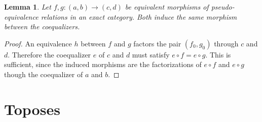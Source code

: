 \documentclass[sort&compress,draft]{elsarticle}
\theoremstyle{plain}
\newtheorem{lemma}[theorem]{Lemma}
\theoremstyle{definition}
\theoremstyle{remark}
\newcommand\hide[1]{}
\newcommand\cat\mathcal
\newcommand\of:
\newcommand\id{\mathrm{id}}
\newcommand\cod{\mathrm{cod}}
\newcommand\di{_!}
\begin{document}
\begin{lemma} Let $f,g\of(a,b)\to(c,d)$ be equivalent morphisms of pseudo-e\-qui\-va\-len\-ce relations in an exact category. Both induce the same morphism between the coequalizers. \label{equivalence implies equality} \end{lemma}

\begin{proof} An equivalence $h$ between $f$ and $g$ factors the pair $(f_0,g_0)$ through $c$ and $d$. Therefore the coequalizer $e$ of $c$ and $d$ must satisfy $e\circ f=e\circ g$. This is sufficient, since the induced morphisms are the factorizations of $e \circ f$ and $e\circ g$ though the coequalizer of $a$ and $b$.
\end{proof}


\hide{\begin{lemma} Let $F\of\cat C\to\cat D$ be a finite limit preserving fully faithful between categories with finite limits and let $\cat D$ be exact. If for each exact $\cat E$ each finite limit preserving functor $G\of\cat C\to\cat E$ has a finite limit preserving left Kan extension $F\di(G)$ along $F$ then $F$ is resolvent. \label{left to resolvent}\end{lemma}

\begin{proof} Define $\cat E$ as follows. Objects are regular epimorphisms $FX\to Y$ in $\cat D$. A morphism $e\to e'$ is a morphism $f\of\cod(e)\to\cod(e')$
such that $f\circ e$ factors through $e'$. This category $\cat E$ is easily proved exact. Let $G\of \cat C\to\cat E$ map $X$ to $\id_{FX}$. This functor preserves finite limits. Any left Kan extension $F\di(G)$ sends each object $D$ of $\cat D$ to a resolvent embedding. Therefore $F$ is resolvent.
\end{proof}}

\hide{ The intuition is equational and essentially algebraic logic. Finite limit preserving functors preserve these.}

\section{Toposes}
\end{document}
